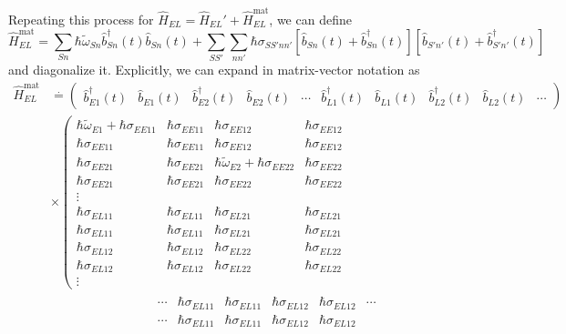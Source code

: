 \documentclass{article}
\begin{document}
Repeating this process for $\hat{H}_{EL} = \hat{H}_{EL}' + \hat{H}_{EL}^\mathrm{mat}$, we can define
\begin{equation}
\hat{H}_{EL}^\mathrm{mat} = \sum_{Sn}\hbar\tilde{\omega}_{Sn}\hat{b}_{Sn}^\dagger(t)\hat{b}_{Sn}(t) + \sum_{SS'}\sum_{nn'}\hbar\sigma_{SS'nn'}\left[\hat{b}_{Sn}(t) + \hat{b}_{Sn}^\dagger(t)\right]\left[\hat{b}_{S'n'}(t) + \hat{b}_{S'n'}^\dagger(t)\right]
\end{equation}
and diagonalize it. Explicitly, we can expand in matrix-vector notation as
\begin{equation}
\begin{split}
\hat{H}_{EL}^\mathrm{mat} &\overset{.}{=} 
\begin{pmatrix}
\hat{b}_{E1}^\dagger(t) & \hat{b}_{E1}(t) & \hat{b}_{E2}^\dagger(t) & \hat{b}_{E2}(t) & \cdots & \hat{b}_{L1}^\dagger(t) & \hat{b}_{L1}(t) & \hat{b}_{L2}^\dagger(t) & \hat{b}_{L2}(t) & \cdots
\end{pmatrix}\\
&\times\left(
\begin{matrix}
\hbar\tilde{\omega}_{E1} + \hbar\sigma_{EE11} & \hbar\sigma_{EE11} & \hbar\sigma_{EE12} & \hbar\sigma_{EE12}\\ 
\hbar\sigma_{EE11} & \hbar\sigma_{EE11} & \hbar\sigma_{EE12} & \hbar\sigma_{EE12}\\
\hbar\sigma_{EE21} & \hbar\sigma_{EE21} & \hbar\tilde{\omega}_{E2} + \hbar\sigma_{EE22} & \hbar\sigma_{EE22}\\
\hbar\sigma_{EE21} & \hbar\sigma_{EE21} & \hbar\sigma_{EE22} & \hbar\sigma_{EE22}\\
\vdots & & & \\
\hbar\sigma_{EL11} & \hbar\sigma_{EL11} & \hbar\sigma_{EL21} & \hbar\sigma_{EL21}\\
\hbar\sigma_{EL11} & \hbar\sigma_{EL11} & \hbar\sigma_{EL21} & \hbar\sigma_{EL21}\\
\hbar\sigma_{EL12} & \hbar\sigma_{EL12} & \hbar\sigma_{EL22} & \hbar\sigma_{EL22}\\
\hbar\sigma_{EL12} & \hbar\sigma_{EL12} & \hbar\sigma_{EL22} & \hbar\sigma_{EL22}\\
\vdots & & &
\end{matrix}
\right.\\
&\qquad\qquad\qquad\qquad\left.
\begin{matrix}
\cdots & \hbar\sigma_{EL11} & \hbar\sigma_{EL11} & \hbar\sigma_{EL12} & \hbar\sigma_{EL12} & \cdots\\
\cdots & \hbar\sigma_{EL11} & \hbar\sigma_{EL11} & \hbar\sigma_{EL12} & \hbar\sigma_{EL12} &\\

\end{matrix}
\end{split}
\end{equation}
\end{document}
